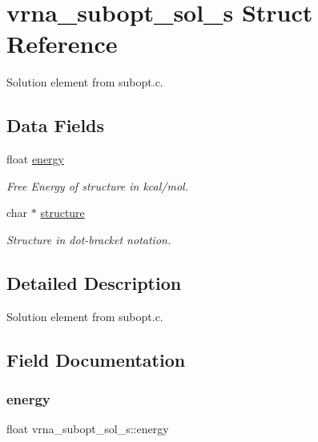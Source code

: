 \hypertarget{structvrna__subopt__sol__s}{}\section{vrna\+\_\+subopt\+\_\+sol\+\_\+s Struct Reference}
\label{structvrna__subopt__sol__s}


Solution element from subopt.\+c.  


\subsection*{Data Fields}
\begin{DoxyCompactItemize}
\item 
float \mbox{\hyperlink{structvrna__subopt__sol__s_a99bc26ca68392aa4656386cf73b73fef}{energy}}
\begin{DoxyCompactList}\small\item\em Free Energy of structure in kcal/mol. \end{DoxyCompactList}\item 
char $\ast$ \mbox{\hyperlink{structvrna__subopt__sol__s_a3c632c7f08eb6a8827c6151625e5ef8e}{structure}}
\begin{DoxyCompactList}\small\item\em Structure in dot-\/bracket notation. \end{DoxyCompactList}\end{DoxyCompactItemize}


\subsection{Detailed Description}
Solution element from subopt.\+c. 

\subsection{Field Documentation}
\mbox{\label{structvrna__subopt__sol__s_a99bc26ca68392aa4656386cf73b73fef}} 
\subsubsection{\texorpdfstring{energy}{energy}}
{\footnotesize\ttfamily float vrna\+\_\+subopt\+\_\+sol\+\_\+s\+::energy}



